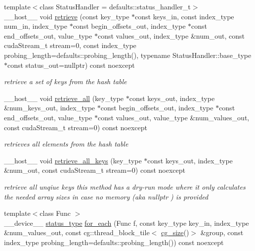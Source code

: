 \begin{DoxyCompactItemize}
{\footnotesize template$<$class Status\+Handler  = defaults\+::status\+\_\+handler\+\_\+t$>$ }\\\+\_\+\+\_\+host\+\_\+\+\_\+ void \hyperlink{classwarpcore_1_1MultiValueHashTable_ac5f44931cff592aff6264d9b74231b08}{retrieve} (const key\+\_\+type $\ast$const keys\+\_\+in, const index\+\_\+type num\+\_\+in, index\+\_\+type $\ast$const begin\+\_\+offsets\+\_\+out, index\+\_\+type $\ast$const end\+\_\+offsets\+\_\+out, value\+\_\+type $\ast$const values\+\_\+out, index\+\_\+type \&num\+\_\+out, const cuda\+Stream\+\_\+t stream=0, const index\+\_\+type probing\+\_\+length=defaults\+::probing\+\_\+length(), typename Status\+Handler\+::base\+\_\+type $\ast$const status\+\_\+out=nullptr) const noexcept
\begin{DoxyCompactList}\small\item\em retrieve a set of keys from the hash table \end{DoxyCompactList}\item 
\+\_\+\+\_\+host\+\_\+\+\_\+ void \hyperlink{classwarpcore_1_1MultiValueHashTable_af061f628a389bb2444044ebf77558889}{retrieve\+\_\+all} (key\+\_\+type $\ast$const keys\+\_\+out, index\+\_\+type \&num\+\_\+keys\+\_\+out, index\+\_\+type $\ast$const begin\+\_\+offsets\+\_\+out, index\+\_\+type $\ast$const end\+\_\+offsets\+\_\+out, value\+\_\+type $\ast$const values\+\_\+out, value\+\_\+type \&num\+\_\+values\+\_\+out, const cuda\+Stream\+\_\+t stream=0) const noexcept
\begin{DoxyCompactList}\small\item\em retrieves all elements from the hash table \end{DoxyCompactList}\item 
\+\_\+\+\_\+host\+\_\+\+\_\+ void \hyperlink{classwarpcore_1_1MultiValueHashTable_adc688c169bfd040d34b2f7480d631294}{retrieve\+\_\+all\+\_\+keys} (key\+\_\+type $\ast$const keys\+\_\+out, index\+\_\+type \&num\+\_\+out, const cuda\+Stream\+\_\+t stream=0) const noexcept
\begin{DoxyCompactList}\small\item\em retrieve all unqiue keys  this method has a dry-\/run mode where it only calculates the needed array sizes in case no memory (aka {\ttfamily nullptr} ) is provided \end{DoxyCompactList}\item 
{\footnotesize template$<$class Func $>$ }\\\+\_\+\+\_\+device\+\_\+\+\_\+ \hyperlink{classwarpcore_1_1Status}{status\+\_\+type} \hyperlink{classwarpcore_1_1MultiValueHashTable_a0372f315323a792c0a2924a32ce2c78d}{for\+\_\+each} (Func f, const key\+\_\+type key\+\_\+in, index\+\_\+type \&num\+\_\+values\+\_\+out, const cg\+::thread\+\_\+block\+\_\+tile$<$ \hyperlink{classwarpcore_1_1MultiValueHashTable_ad300c5a01bd933343ff08176fb4b4e29}{cg\+\_\+size}()$>$ \&group, const index\+\_\+type probing\+\_\+length=defaults\+::probing\+\_\+length()) const noexcept

\end{DoxyCompactItemize}

